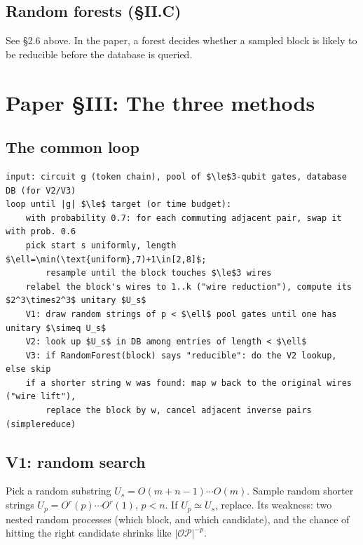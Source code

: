 \documentclass[11pt,a4paper]{article}
\begin{document}
\subsection{Random forests (\S II.C)}
See \S2.6 above. In the paper, a forest decides whether a sampled block is likely to be reducible before
the database is queried.

\section{Paper \S III: The three methods}
\subsection{The common loop}
\begin{lstlisting}
input: circuit g (token chain), pool of $\le$3-qubit gates, database DB (for V2/V3)
loop until |g| $\le$ target (or time budget):
    with probability 0.7: for each commuting adjacent pair, swap it with prob. 0.6
    pick start s uniformly, length $\ell=\min(\text{uniform},7)+1\in[2,8]$;
        resample until the block touches $\le$3 wires
    relabel the block's wires to 1..k ("wire reduction"), compute its $2^3\times2^3$ unitary $U_s$
    V1: draw random strings of p < $\ell$ pool gates until one has unitary $\simeq U_s$
    V2: look up $U_s$ in DB among entries of length < $\ell$
    V3: if RandomForest(block) says "reducible": do the V2 lookup, else skip
    if a shorter string w was found: map w back to the original wires ("wire lift"),
        replace the block by w, cancel adjacent inverse pairs (simplereduce)
\end{lstlisting}

\subsection{V1: random search}
Pick a random substring $U_s=O(m{+}n{-}1)\cdots O(m)$. Sample random shorter strings $U_p=O^r(p)\cdots O^r(1)$, $p<n$.
If $U_p\simeq U_s$, replace. Its weakness: two nested random processes (which block, and which candidate), and the chance
of hitting the right candidate shrinks like $|\mathcal{OP}|^{-p}$.
\end{document}
